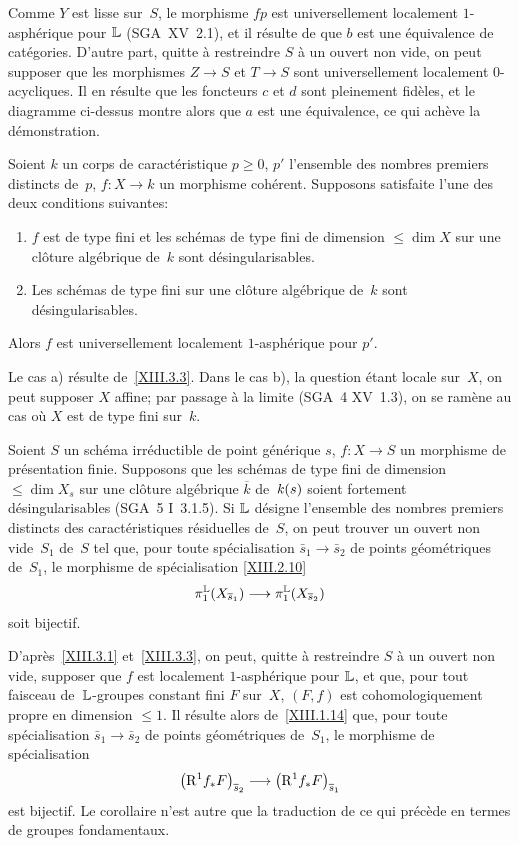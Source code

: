 Comme $Y$ est lisse sur~$S$, le morphisme $fp$ est universellement
localement $1$-asph\'erique pour $\mathbb{L}$ (SGA~XV~2.1),
et il r\'esulte de \cite[VII 2.1.7]{XIII.2} que $b$ est une \'equivalence de
cat\'egories. D'autre part, quitte \`a restreindre $S$ \`a un
ouvert non vide, on peut supposer que les morphismes $Z\to S$ et $T\to
S$ sont universellement localement $0$-acycliques. Il en r\'esulte
que les foncteurs $c$ et $d$ sont pleinement fid\`eles, et le
diagramme ci-dessus montre alors que $a$ est une \'equivalence, ce
qui ach\`eve la d\'emonstration.
\begin{corollaire}
\label{XIII.3.4}
Soient $k$ un corps de caract\'eristique $p\geqslant0$, $p'$
l'ensemble des nombres premiers distincts de~$p$, $f\colon X\to k$ un
morphisme coh\'erent. Supposons satisfaite l'une des deux
conditions suivantes:
\begin{enumerate}
\item[a)] $f$ est de type fini et les sch\'emas de type fini de
dimension $\leqslant\dim X$ sur une cl\^oture alg\'ebrique de~$k$
sont d\'esingularisables.
\item[b)] Les sch\'emas de type fini sur une cl\^oture
alg\'ebrique de~$k$ sont d\'esingularisables.
\end{enumerate}
Alors $f$ est universellement localement $1$-asph\'erique pour $p'$.
\end{corollaire}

Le cas a) r\'esulte de~\ref{XIII.3.3}. Dans le cas b), la question
\'etant locale sur~$X$, on peut supposer $X$ affine; par passage
\`a la limite (SGA~4 XV~1.3), on se ram\`ene au cas o\`u $X$ est
de type fini sur~$k$.
\begin{corollaire}
\label{XIII.3.5}
Soient
$S$ un sch\'ema irr\'eductible de point g\'en\'erique
$s$, $f\colon X\to S$ un morphisme de pr\'esentation
finie. Supposons que les sch\'emas de type fini de dimension
$\leqslant\dim X_s$ sur une cl\^oture alg\'ebrique $\overline{k}$
de~$\mathit{k}(s)$ soient fortement d\'esingularisables \textup{(SGA~5 I~3.1.5)}. Si
$\mathbb{L}$ d\'esigne l'ensemble des nombres premiers distincts des
caract\'eristiques r\'esiduelles de~$S$, on peut trouver un ouvert
non vide~$S_1$ de~$S$ tel que, pour toute sp\'ecialisation
$\bar{s}_1\to\bar{s}_2$ de points g\'eom\'etriques de~$S_1$, le
morphisme de sp\'ecialisation \eqref{XIII.2.10}
$$
\pi_1^{\LL}(X_{\bar{s}_1})\to\pi_1^{\LL}(X_{\bar{s}_2})
$$
soit bijectif.
\end{corollaire}

D'apr\`es~\ref{XIII.3.1} et~\ref{XIII.3.3}, on peut, quitte \`a
restreindre $S$ \`a un ouvert non vide, supposer que $f$ est
localement $1$-asph\'erique pour $\mathbb{L}$, et que, pour tout faisceau
de~$\mathbb{L}$-groupes constant fini $F$ sur~$X$, $(F,f)$ est
cohomologiquement propre en dimension $\leqslant 1$. Il r\'esulte
alors de~\ref{XIII.1.14} que, pour toute sp\'ecialisation
$\bar{s}_1\to\bar{s}_2$ de points g\'eom\'etriques de~$S_1$, le
morphisme de sp\'ecialisation
$$
\left(\R^1 f_* F\right)_{\bar{s}_2} \to \left(\R^1 f_*
F\right)_{\bar{s}_1}
$$
est bijectif. Le corollaire n'est autre que la traduction de ce qui
pr\'ec\`ede en termes de groupes fondamentaux.

